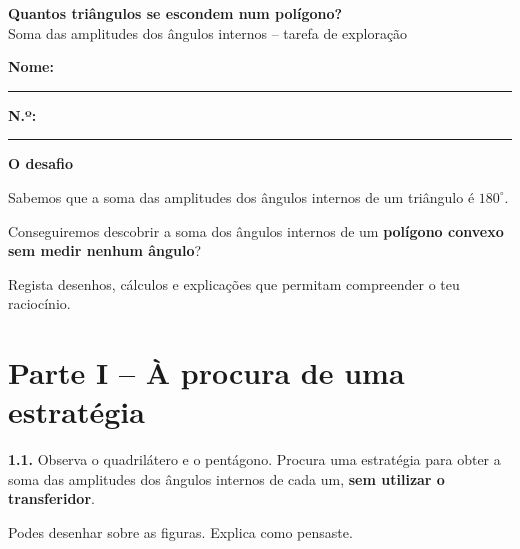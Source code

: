 
\begin{center}
{\LARGE\bfseries\color{azulPDMI}
Quantos triângulos se escondem num polígono?}\\[2pt]
{\small Soma das amplitudes dos ângulos internos
-- tarefa de exploração}
\end{center}

\vspace{2pt}

\noindent
\textbf{Nome:} \rule{8.1cm}{0.4pt}
\hfill
\textbf{N.º:} \rule{1.3cm}{0.4pt}

\begin{tcolorbox}[
colback=azulClaro,
colframe=azulPDMI!45,
boxrule=0.5pt,
arc=2mm,
left=7pt,
right=7pt,
top=5pt,
bottom=5pt
]

\textbf{O desafio}\par

Sabemos que a soma das amplitudes dos
ângulos internos de um triângulo é
$180^\circ$.

Conseguiremos descobrir a soma dos
ângulos internos de um
\textbf{polígono convexo sem medir
nenhum ângulo}?

Regista desenhos, cálculos e explicações
que permitam compreender o teu raciocínio.

\end{tcolorbox}


\section*{Parte I -- À procura de uma estratégia}

\textbf{1.1.}
Observa o quadrilátero e o pentágono.
Procura uma estratégia para obter a soma
das amplitudes dos ângulos internos de
cada um, \textbf{sem utilizar o transferidor}.

Podes desenhar sobre as figuras.
Explica como pensaste.

\vspace{2pt}

